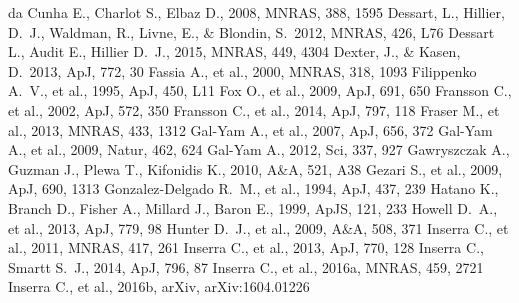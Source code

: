 \documentclass[useAMS,usenatbib]{mn2e}
\begin{document}
\begin{thebibliography}{99}
 da Cunha E., Charlot S., Elbaz D., 2008, MNRAS, 388, 1595 
 Dessart, L., Hillier, 
D.~J., Waldman, R., Livne, E., \& Blondin, S.\ 2012, MNRAS, 426, L76 
 Dessart L., Audit E., Hillier D.~J., 2015, MNRAS, 449, 4304 
 Dexter, J., \& Kasen, D.\ 2013, ApJ, 772, 30
 Fassia A., et al., 2000, MNRAS, 318, 1093 
 Filippenko A.~V., et al., 1995, ApJ, 450, L11 
 Fox O., et al., 2009, ApJ, 691, 650 
 Fransson C., et al., 2002, ApJ, 572, 350 
 Fransson C., et al., 2014, ApJ, 797, 118 
 Fraser M., et al., 2013, MNRAS, 433, 1312 
 Gal-Yam A., et al., 2007, ApJ, 656, 372 
 Gal-Yam A., et al., 2009, Natur, 462, 624
Gal-Yam A., 2012, Sci, 337, 927
 Gawryszczak A., Guzman J., Plewa T., Kifonidis K., 2010, A\&A, 521, A38 
 Gezari S., et al., 2009, ApJ, 690, 1313 
 Gonzalez-Delgado R.~M., et al., 1994, ApJ, 437, 239 
 Hatano K., Branch D., Fisher A., Millard J., Baron E., 1999, ApJS, 121, 233 
 Howell D.~A., et al., 2013, ApJ, 779, 98 
 Hunter D.~J., et al., 2009, A\&A, 508, 371
 Inserra C., et al., 2011, MNRAS, 417, 261 
 Inserra C., et al., 2013, ApJ, 770, 128 
 Inserra C., Smartt S.~J., 2014, ApJ, 796, 87
 Inserra C., et al., 2016a, MNRAS, 459, 2721 
 Inserra C., et al., 2016b, arXiv, arXiv:1604.01226 

\end{thebibliography}
\end{document}
